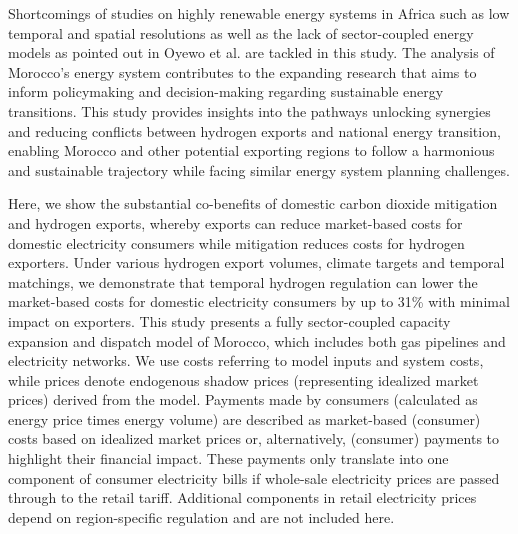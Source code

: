 \documentclass[5p,numafflabel]{elsarticle}
\begin{document}
Shortcomings of studies on highly renewable energy systems in Africa such as low temporal and spatial resolutions as well as the lack of sector-coupled energy models as pointed out in Oyewo et al.\cite{Oyewo2023} are tackled in this study. The analysis of Morocco's energy system contributes to the expanding research that aims to inform policymaking and decision-making regarding sustainable energy transitions. This study provides insights into the pathways unlocking synergies and reducing conflicts between hydrogen exports and national energy transition, enabling Morocco and other potential exporting regions to follow a harmonious and sustainable trajectory while facing similar energy system planning challenges.







Here, we show the substantial co-benefits of domestic carbon dioxide mitigation and hydrogen exports, whereby exports can reduce market-based costs for domestic electricity consumers while mitigation reduces costs for hydrogen exporters.
Under various hydrogen export volumes, climate targets and temporal matchings, we demonstrate 
that temporal hydrogen regulation can lower the market-based costs for domestic electricity consumers by up to 31\% with minimal impact on exporters.
This study presents a fully sector-coupled capacity expansion and dispatch model of Morocco, which includes both gas pipelines and electricity networks. 
We use costs referring to model inputs and system costs, while prices denote endogenous shadow prices (representing idealized market prices) derived from the model. Payments made by consumers (calculated as energy price times energy volume) are described as market-based (consumer) costs based on idealized market prices or, alternatively, (consumer) payments to highlight their financial impact. 
These payments only translate into one component of consumer electricity bills if whole-sale electricity prices are passed through to the retail tariff. Additional components in retail electricity prices depend on region-specific regulation and are not included here.
\end{document}
